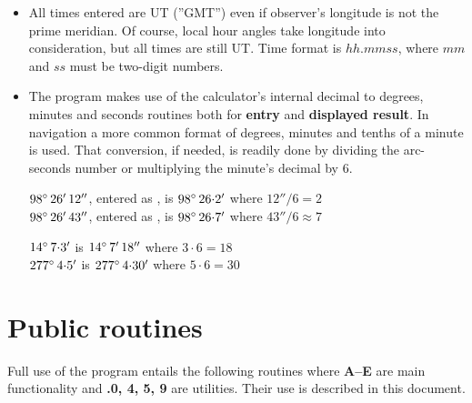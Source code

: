 \documentclass[english,a4paper,onepage, 10pt]{scrbook}
\begin{document}
\begin{itemize}
\item All times entered are UT (''GMT'') even if observer's longitude is not the prime meridian. Of course, local hour angles take longitude into consideration, but all times are still UT. Time format is $hh.mmss$, where $mm$ and $ss$ must be two-digit numbers.


\item The program makes use of the calculator's internal decimal to degrees, minutes and seconds routines both for \textbf{entry} and \textbf{displayed result}. In navigation a more common format of degrees, minutes and tenths of a minute is used. That conversion, if needed, is readily done by dividing the arc-seconds number or multiplying the minute's decimal by 6.


 $98\degree\, 26'\, 12''$, entered as ,  is $98\degree\, 26{\cdot}2'$ where $12''/6=2$\\
 $98\degree\, 26'\, 43''$, entered as , is $98\degree\, 26{\cdot}7'$ where $43''/6\approx7$
 \slutex
 

 $14\degree\, 7{\cdot}3'$  is $14\degree\, 7'\, 18''$ where $3 \cdot 6=18$\\
 $277\degree\, 4{\cdot}5'$  is $277\degree\, 4{\cdot}30'$ where $5 \cdot 6=30$
 \slutex
 
\end{itemize}
 

\section{Public routines} 

Full use of the program entails the following routines where \textbf{\textsf{A--E}} are main functionality and \textbf{\textsf{.0, 4, 5, 9}} are utilities. Their use is described in this document. 
\end{document}

